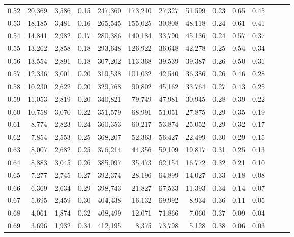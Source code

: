 \begin{tabular}{rrrrrrrrrrrrrr}
0.52 &  20,369 &  3,586 &  0.15 &  247,360 &  173,210 &  27,327 &  51,599 &  0.23 &  0.65 &      0.45 \\
0.53 &  18,185 &  3,481 &  0.16 &  265,545 &  155,025 &  30,808 &  48,118 &  0.24 &  0.61 &      0.41 \\
0.54 &  14,841 &  2,982 &  0.17 &  280,386 &  140,184 &  33,790 &  45,136 &  0.24 &  0.57 &      0.37 \\
0.55 &  13,262 &  2,858 &  0.18 &  293,648 &  126,922 &  36,648 &  42,278 &  0.25 &  0.54 &      0.34 \\
0.56 &  13,554 &  2,891 &  0.18 &  307,202 &  113,368 &  39,539 &  39,387 &  0.26 &  0.50 &      0.31 \\
0.57 &  12,336 &  3,001 &  0.20 &  319,538 &  101,032 &  42,540 &  36,386 &  0.26 &  0.46 &      0.28 \\
0.58 &  10,230 &  2,622 &  0.20 &  329,768 &   90,802 &  45,162 &  33,764 &  0.27 &  0.43 &      0.25 \\
0.59 &  11,053 &  2,819 &  0.20 &  340,821 &   79,749 &  47,981 &  30,945 &  0.28 &  0.39 &      0.22 \\
0.60 &  10,758 &  3,070 &  0.22 &  351,579 &   68,991 &  51,051 &  27,875 &  0.29 &  0.35 &      0.19 \\
0.61 &   8,774 &  2,823 &  0.24 &  360,353 &   60,217 &  53,874 &  25,052 &  0.29 &  0.32 &      0.17 \\
0.62 &   7,854 &  2,553 &  0.25 &  368,207 &   52,363 &  56,427 &  22,499 &  0.30 &  0.29 &      0.15 \\
0.63 &   8,007 &  2,682 &  0.25 &  376,214 &   44,356 &  59,109 &  19,817 &  0.31 &  0.25 &      0.13 \\
0.64 &   8,883 &  3,045 &  0.26 &  385,097 &   35,473 &  62,154 &  16,772 &  0.32 &  0.21 &      0.10 \\
0.65 &   7,277 &  2,745 &  0.27 &  392,374 &   28,196 &  64,899 &  14,027 &  0.33 &  0.18 &      0.08 \\
0.66 &   6,369 &  2,634 &  0.29 &  398,743 &   21,827 &  67,533 &  11,393 &  0.34 &  0.14 &      0.07 \\
0.67 &   5,695 &  2,459 &  0.30 &  404,438 &   16,132 &  69,992 &   8,934 &  0.36 &  0.11 &      0.05 \\
0.68 &   4,061 &  1,874 &  0.32 &  408,499 &   12,071 &  71,866 &   7,060 &  0.37 &  0.09 &      0.04 \\
0.69 &   3,696 &  1,932 &  0.34 &  412,195 &    8,375 &  73,798 &   5,128 &  0.38 &  0.06 &      0.03 \\

\end{tabular}
